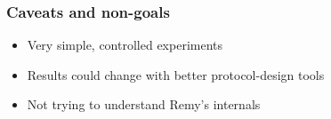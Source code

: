 \begin{frame}
\frametitle{Caveats and non-goals}
\begin{itemize}
\item Very simple, controlled experiments
\item Results could change with better protocol-design tools
\item Not trying to understand Remy's internals
\end{itemize}
\end{frame}
